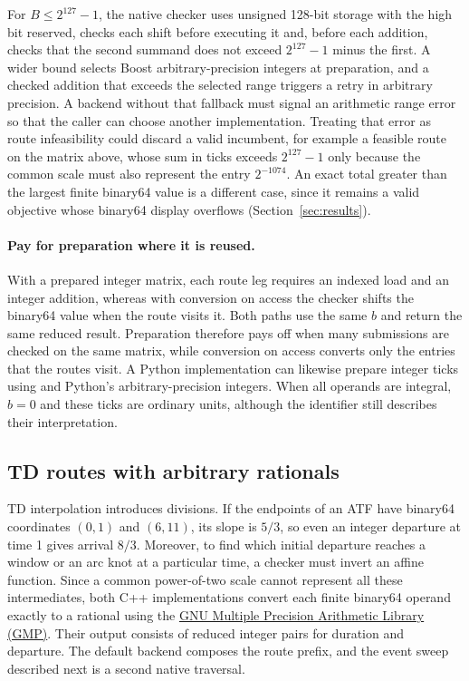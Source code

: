For $B\leq2^{127}-1$, the native checker uses unsigned 128-bit storage with the high bit reserved, checks each shift before executing it and, before each addition, checks that the second summand does not exceed $2^{127}-1$ minus the first. A wider bound selects Boost arbitrary-precision integers at preparation, and a checked addition that exceeds the selected range triggers a retry in arbitrary precision. A backend without that fallback must signal an arithmetic range error so that the caller can choose another implementation. Treating that error as route infeasibility could discard a valid incumbent, for example a feasible route on the matrix above, whose sum in ticks exceeds $2^{127}-1$ only because the common scale must also represent the entry $2^{-1074}$. An exact total greater than the largest finite binary64 value is a different case, since it remains a valid objective whose binary64 display overflows (Section~\ref{sec:results}).

\paragraph{Pay for preparation where it is reused.}
With a prepared integer matrix, each route leg requires an indexed load and an integer addition, whereas with conversion on access the checker shifts the binary64 value when the route visits it. Both paths use the same $b$ and return the same reduced result. Preparation therefore pays off when many submissions are checked on the same matrix, while conversion on access converts only the entries that the routes visit. A Python implementation can likewise prepare integer ticks using  and Python's arbitrary-precision integers. When all operands are integral, $b=0$ and these ticks are ordinary units, although the  identifier still describes their interpretation.

\subsection{TD routes with arbitrary rationals}\label{app:td-rationals}

TD interpolation introduces divisions. If the endpoints of an ATF have binary64 coordinates $(0,1)$ and $(6,11)$, its slope is $5/3$, so even an integer departure at time 1 gives arrival $8/3$. Moreover, to find which initial departure reaches a window or an arc knot at a particular time, a checker must invert an affine function. Since a common power-of-two scale cannot represent all these intermediates, both C++ implementations convert each finite binary64 operand exactly to a rational using the \href{https://gmplib.org/manual/Rational-Conversions}{GNU Multiple Precision Arithmetic Library (GMP)}. Their output consists of reduced integer pairs for duration and departure. The default backend composes the route prefix, and the event sweep described next is a second native traversal.

